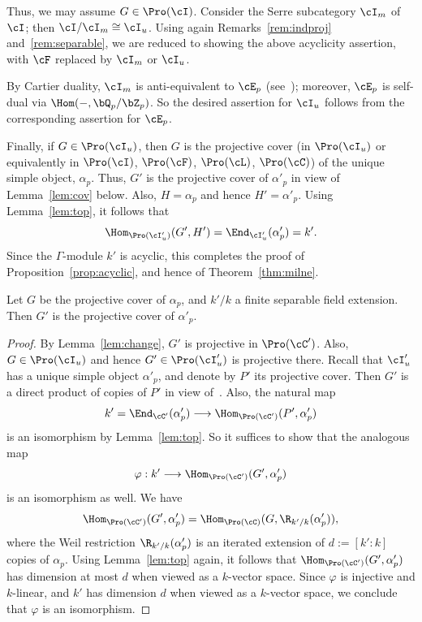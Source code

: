 Thus, we may assume $G \in \Pro(\cI)$. Consider the Serre subcategory $\cI_m$ of $\cI$; then $\cI/\cI_m \cong \cI_u$. Using again Remarks~\ref{rem:indproj} and~\ref{rem:separable}, we are reduced to showing the above acyclicity assertion, with $\cF$ replaced by $\cI_m$ or $\cI_u$.

By Cartier duality, $\cI_m$ is anti-equivalent to $\cE_p$ (see~\cite[IV.1.3]{DG}); moreover, $\cE_p$ is self-dual via $\Hom(-, \bQ_p/\bZ_p)$. So the desired assertion for $\cI_u$ follows from the corresponding assertion for $\cE_p$.

Finally, if $G \in \Pro(\cI_u)$, then $G$ is the projective cover (in $\Pro(\cI_u)$ or equivalently in $\Pro(\cI)$, $\Pro(\cF)$, $\Pro(\cL)$, $\Pro(\cC)$) of the unique simple object, $\alpha_p$. Thus, $G'$ is the projective cover of $\alpha'_p$ in view of Lemma~\ref{lem:cov} below. Also, $H = \alpha_p$ and hence $H' = \alpha'_p$. Using Lemma~\ref{lem:top}, it follows that
\[
\Hom_{\Pro(\cI'_u)}(G', H') =
\End_{\cI'_u}(\alpha'_p) = k'.
\]
Since the $\Gamma$-module $k'$ is acyclic, this completes the proof of Proposition~\ref{prop:acyclic}, and hence of Theorem~\ref{thm:milne}.


\begin{lemm}\label{lem:cov}
Let $G$ be the projective cover of $\alpha_p$, and $k'/k$ a finite separable field extension. Then $G'$ is the projective cover of $\alpha'_p$.
\end{lemm}

\begin{proof}
By Lemma~\ref{lem:change}, $G'$ is projective in $\Pro(\cC')$. Also, $G \in \Pro(\cI_u)$ and hence $G' \in \Pro(\cI_u')$ is projective there. Recall that $\cI'_u$ has a unique simple object $\alpha'_p$, and denote by $P'$ its projective cover. Then $G'$ is a direct product of copies of $P'$ in view of~\cite[V.2.4.6$\MK$b)]{DG}. Also, the natural map
\[
k' = \End_{\cC'}(\alpha'_p) \longrightarrow
\Hom_{\Pro(\cC')}(P', \alpha'_p)
\]
is an isomorphism by Lemma~\ref{lem:top}. So it suffices to show that the analogous map
\[
\varphi : k' \longrightarrow
\Hom_{\Pro(\cC')}(G', \alpha'_p)
\]
is an isomorphism as well. We have
\[
\Hom_{\Pro(\cC')}(G', \alpha'_p) =
\Hom_{\Pro(\cC)}(G, \R_{k'/k}(\alpha'_p)),
\]
where the Weil restriction $\R_{k'/k}(\alpha'_p)$ is an iterated extension of $d := [k':k]$ copies of $\alpha_p$. Using Lemma~\ref{lem:top} again, it follows that $\Hom_{\Pro(\cC')}(G', \alpha'_p)$ has dimension at most $d$ when viewed as a $k$-vector space. Since $\varphi$ is injective and $k$-linear, and $k'$ has dimension $d$ when viewed as a $k$-vector space, we conclude that $\varphi$ is an isomorphism.
\end{proof}


